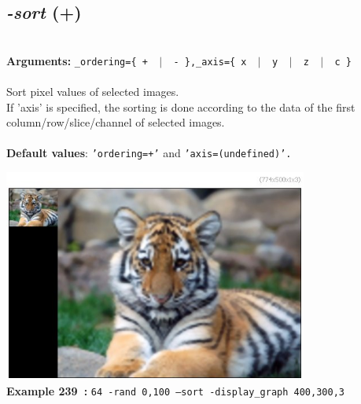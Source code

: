 \documentclass[a4paper,11pt,twoside]{book}
\begin{document}
\subsection{\emph{-sort} (+)}\vspace*{-0.5em}
~\\\textbf{Arguments: } 
{\small \texttt{\_ordering=\{ + ~$|$~ - \},\_axis=\{ x ~$|$~ y ~$|$~ z ~$|$~ c \}}}\\~\\
Sort pixel values of selected images.
~\\If 'axis' is specified, the sorting is done according to the data of the first column/row/slice/channel
of selected images.
~\\~\\\textbf{Default values}: {\small \texttt{'ordering=+'} and \texttt{'axis=(undefined)'.}}
\begin{center}\includegraphics[keepaspectratio=true,height=7cm,width=\textwidth]{img/gmic_def239.jpg}\\
{\footnotesize \textbf{Example 239~:} \texttt{64 -rand 0,100 --sort -display\_graph 400,300,3}}
\end{center}
\end{document}
